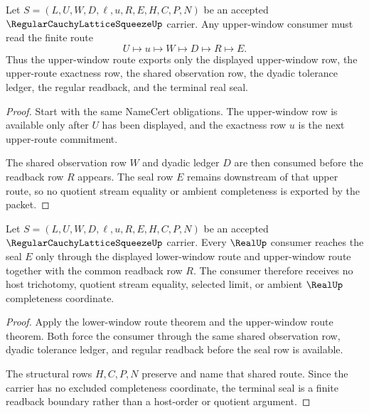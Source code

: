 \begin{theorem}
\label{thm:regular-cauchy-lattice-squeeze-upper-window-route}
Let $S=(L,U,W,D,\ell,u,R,E,H,C,P,N)$ be an accepted $\RegularCauchyLatticeSqueezeUp$ carrier. Any upper-window consumer must read the finite route
$$
U \longmapsto u \longmapsto W \longmapsto D \longmapsto R \longmapsto E .
$$
Thus the upper-window route exports only the displayed upper-window row, the upper-route exactness row, the shared observation row, the dyadic tolerance ledger, the regular readback, and the terminal real seal.
\end{theorem}
\begin{proof}
Start with the same NameCert obligations. The upper-window row is available only after $U$ has been displayed, and the exactness row $u$ is the next upper-route commitment.

The shared observation row $W$ and dyadic ledger $D$ are then consumed before the readback row $R$ appears. The seal row $E$ remains downstream of that upper route, so no quotient stream equality or ambient completeness is exported by the packet.
\end{proof}

\begin{theorem}
\label{thm:regular-cauchy-lattice-squeeze-realup-seal-nonescape}
Let $S=(L,U,W,D,\ell,u,R,E,H,C,P,N)$ be an accepted $\RegularCauchyLatticeSqueezeUp$ carrier. Every $\RealUp$ consumer reaches the seal $E$ only through the displayed lower-window route and upper-window route together with the common readback row $R$. The consumer therefore receives no host trichotomy, quotient stream equality, selected limit, or ambient $\RealUp$ completeness coordinate.
\end{theorem}
\begin{proof}
Apply the lower-window route theorem and the upper-window route theorem. Both force the consumer through the same shared observation row, dyadic tolerance ledger, and regular readback before the seal row is available.

The structural rows $H,C,P,N$ preserve and name that shared route. Since the carrier has no excluded completeness coordinate, the terminal seal is a finite readback boundary rather than a host-order or quotient argument.
\end{proof}



